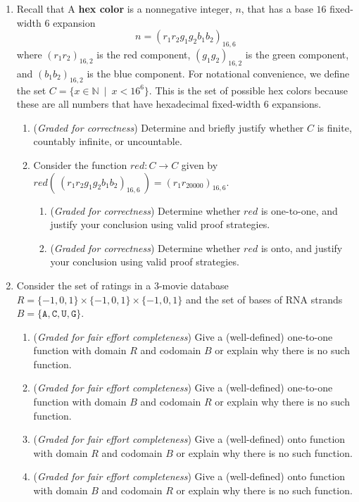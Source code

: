 \documentclass[12pt, oneside]{article}
\newcommand{\A}[0]{\texttt{A}}
\newcommand{\C}[0]{\texttt{C}}
\newcommand{\G}[0]{\texttt{G}}
\newcommand{\U}[0]{\texttt{U}}
\begin{document}
\begin{enumerate}
   \item Recall that  A {\bf hex color} is a nonnegative
   integer, $n$, that has a base $16$ fixed-width $6$ expansion
   $$n = (r_1r_2g_1g_2b_1b_2)_{16,6}$$ 
   where $(r_1r_2)_{16,2}$ is the red
   component, $(g_1g_2)_{16,2}$ is the green component, and $(b_1b_2)_{16,2}$ is the
   blue component.   For notational convenience, we define the set 
   $C = \{ x \in \mathbb{N} ~\mid~x  < 16^6 \}$.  This is the set of possible hex colors because these
   are all numbers that have hexadecimal fixed-width $6$ expansions. 
   \begin{enumerate}
    \item ({\it Graded for correctness}) Determine and briefly justify whether $C$ is finite, countably infinite, or uncountable.
    \item Consider the function $red: C \to C$ given by $red(~(r_1r_2g_1g_2b_1b_2)_{16,6}~) = (r_1r_20000)_{16,6}$.
        \begin{enumerate}
            \item ({\it Graded for correctness}) Determine whether $red$ is one-to-one, 
            and justify your conclusion using valid proof strategies.
            \item ({\it Graded for correctness}) Determine whether $red$ is onto, 
            and justify your conclusion using valid proof strategies.
        \end{enumerate}
   \end{enumerate}

    \item Consider the set of ratings in a 3-movie database 
    $R = \{ -1,0,1\} \times \{-1,0,1\} \times \{-1,0,1\}$ and the set of 
    bases of RNA strands $B = \{\A, \C, \U, \G\}$.
    \begin{enumerate}
        \item ({\it Graded for fair effort completeness}) Give a (well-defined) one-to-one function with domain $R$ and codomain $B$ or explain why there is no such function.
        \item ({\it Graded for fair effort completeness}) Give a (well-defined) one-to-one function with domain $B$ and codomain $R$ or explain why there is no such function.
        \item ({\it Graded for fair effort completeness}) Give a (well-defined) onto function with domain $R$ and codomain $B$ or explain why there is no such function.
        \item ({\it Graded for fair effort completeness}) Give a (well-defined) onto function with domain $B$ and codomain $R$ or explain why there is no such function.
    \end{enumerate}


\end{enumerate}
\end{document}
